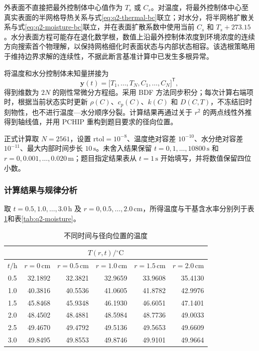外表面不直接把最外控制体中心值作为 $T_s$ 或 $C_s$。对温度，将最外控制体中心至真实表面的半网格导热关系与式\eqref{eq:q2-thermal-bc}联立；对水分，将半网格扩散关系与式\eqref{eq:q2-moisture-bc}联立，并在表面扩散系数中使用当前 $C_s$ 和 $T_s+273.15$。水分表面方程可能存在退化数学根，数值上沿最外控制体浓度到环境浓度的连续方向搜索首个物理解，以保持网格细化时表面状态与内部状态相容。该选根策略用于维持边界求解的连续性，不据此断言基准计算中已发生多根异常。

将温度和水分控制体未知量拼接为
\begin{equation}
\boldsymbol y(t)=
\bigl[T_1,\ldots,T_N,C_1,\ldots,C_N\bigr]^{\mathsf T},
\label{eq:q2-state}
\end{equation}
得到维数为 $2N$ 的刚性常微分方程组。采用 BDF 方法同步积分；每次计算右端项时，根据当前状态实时更新 $\rho(C)$、$c_p(C)$、$k(C)$ 和 $D(C,T)$，不冻结旧时刻物性，也不进行温度—水分顺序分裂。计算结果再通过关于 $r^2$ 的两点线性外推得到轴线值，并用 PCHIP 重构到题目要求的径向位置。

正式计算取 $N=2561$，设置 $\mathrm{rtol}=10^{-8}$、温度绝对容差 $10^{-10}$、水分绝对容差 $10^{-11}$、最大内部时间步长 $10\,\mathrm{s}$。未舍入结果保留 $t=0,1,\ldots,10800\,\mathrm{s}$ 和 $r=0,0.001,\ldots,0.020\,\mathrm{m}$；题目指定结果表从 $t=1\,\mathrm{s}$ 开始填写，并将数值保留四位小数。

\subsubsection{计算结果与规律分析}

取 $t=0.5,1.0,\ldots,3.0\,\mathrm{h}$ 及 $r=0,0.5,\ldots,2.0\,\mathrm{cm}$，所得温度与干基含水率分别列于表\ref{tab:q2-temperature}和表\ref{tab:q2-moisture}。

\begin{table}[H]
\centering
\caption{不同时间与径向位置的温度}
\label{tab:q2-temperature}
\begin{tabular}{@{}crrrrr@{}}
\toprule
\multicolumn{6}{c}{$T(r,t)/{}^\circ\mathrm{C}$}\\
\midrule
$t/\mathrm{h}$ & $r=0\,\mathrm{cm}$ & $r=0.5\,\mathrm{cm}$ & $r=1.0\,\mathrm{cm}$ & $r=1.5\,\mathrm{cm}$ & $r=2.0\,\mathrm{cm}$ \\
\midrule
0.5 & 32.1892 & 32.3821 & 32.9659 & 33.9608 & 35.4130 \\
1.0 & 40.3816 & 40.5536 & 41.0605 & 41.8782 & 42.9976 \\
1.5 & 45.8468 & 45.9348 & 46.1930 & 46.6051 & 47.1401 \\
2.0 & 48.4502 & 48.4881 & 48.5984 & 48.7736 & 49.0033 \\
2.5 & 49.4670 & 49.4792 & 49.5136 & 49.5653 & 49.6609 \\
3.0 & 49.8495 & 49.8553 & 49.8746 & 49.9101 & 49.9664 \\
\bottomrule
\end{tabular}
\end{table}

